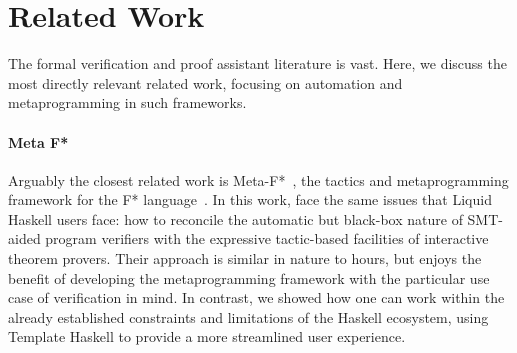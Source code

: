 \section{Related Work}
\label{sec:related}

The formal verification and proof assistant literature is vast. Here, we discuss
the most directly relevant related work, focusing on automation and metaprogramming
in such frameworks.

\paragraph{Meta F*}
Arguably the closest related work is Meta-F*~\cite{MetaF}, the tactics
and metaprogramming framework for the F* language~\cite{fstar}. In
this work, \citeauthor{MetaF} face the same issues that Liquid Haskell
users face: how to reconcile the automatic but black-box nature of
SMT-aided program verifiers with the expressive tactic-based facilities of
interactive theorem provers. Their approach is similar in nature to hours,
but enjoys the benefit of developing the metaprogramming framework with
the particular use case of verification in mind. In contrast, we showed
how one can work within the already established constraints and limitations
of the Haskell ecosystem, using Template Haskell to provide a more
streamlined user experience.

